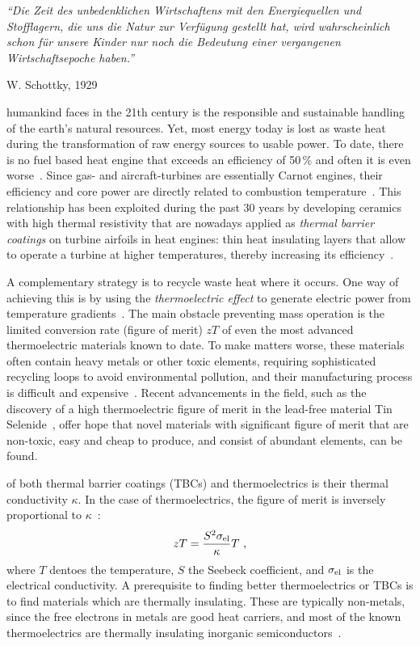 \epigraph{\singlespacing \it ``Die Zeit des unbedenklichen Wirtschaftens mit den Energiequellen und Stofflagern, die uns die Natur zur Verfügung gestellt hat, wird wahrscheinlich schon für unsere Kinder nur noch die Bedeutung einer vergangenen Wirtschaftsepoche haben.''}{W. Schottky, 1929~\cite{Schottky1929}}
 humankind faces in the 21th century is the responsible and sustainable handling of the earth's natural resources.  Yet, most energy today is lost as waste heat during the transformation of raw energy sources to usable power. To date, there is no fuel based heat engine that exceeds an efficiency of 50\,\% and often it is even worse~\cite{eia}. 
Since gas- and aircraft-turbines are essentially Carnot engines, their efficiency and core power are directly related to combustion temperature~\cite{Clarke.2012,Perepezko.2009}. This relationship has been exploited during the past 30 years by developing 
ceramics with high thermal resistivity that are nowadays applied as \emph{thermal barrier coatings} on turbine airfoils in heat engines: thin heat insulating layers that allow to operate a turbine at higher temperatures, thereby increasing its efficiency~\cite{Clarke.2003}.

A complementary strategy is to recycle waste heat where it occurs. One way of achieving this is by using the \emph{thermoelectric effect} to  generate electric power from temperature gradients~\cite{Snyder.2008}. The main obstacle preventing mass operation is the limited conversion rate (figure of merit) $zT$ of even the most advanced thermoelectric materials known to date. To make matters worse, these materials often contain heavy metals or other toxic elements, requiring sophisticated recycling loops to avoid environmental pollution, and their manufacturing process is difficult and expensive~\cite{Nolas2001}. Recent advancements in the field, such as the discovery of a high thermoelectric figure of merit in the lead-free material Tin Selenide~\cite{Zhao.2014}, offer hope that novel materials with significant figure of merit that are non-toxic, easy and cheap to produce, and consist of abundant elements, can be found.

 of both thermal barrier coatings (TBCs) and thermoelectrics is their thermal conductivity $\kappa$. In the case of thermoelectrics, the figure of merit is inversely proportional to $\kappa$~\cite{Nolas2001}:
\begin{align}
zT = \frac{S^2 \sigma_{\rm el}}{\kappa} T~,
\label{eq:zT}
\end{align} 
where $T$ dentoes the temperature, $S$ the Seebeck coefficient, and $\sigma_{\rm el}$ is the electrical conductivity.
A prerequisite to finding better thermoelectrics or TBCs is to find materials which are thermally insulating. These are typically non-metals, since the free electrons in metals are good heat carriers, and most of the known thermoelectrics are thermally insulating inorganic semiconductors~\cite[p.\,15]{Nolas2001}.

